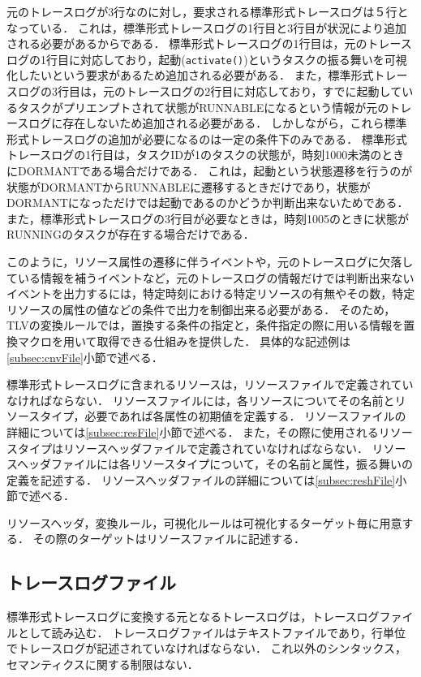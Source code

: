 元のトレースログが3行なのに対し，要求される標準形式トレースログは５行となっている．
これは，標準形式トレースログの1行目と3行目が状況により追加される必要があるからである．
標準形式トレースログの1行目は，元のトレースログの1行目に対応しており，起動(\verb|activate()|)というタスクの振る舞いを可視化したいという要求があるため追加される必要がある．
また，標準形式トレースログの3行目は，元のトレースログの2行目に対応しており，すでに起動しているタスクがプリエンプトされて状態がRUNNABLEになるという情報が元のトレースログに存在しないため追加される必要がある．
しかしながら，これら標準形式トレースログの追加が必要になるのは一定の条件下のみである．
標準形式トレースログの1行目は，タスクIDが1のタスクの状態が，時刻1000未満のときにDORMANTである場合だけである．
これは，起動という状態遷移を行うのが状態がDORMANTからRUNNABLEに遷移するときだけであり，状態がDORMANTになっただけでは起動であるのかどうか判断出来ないためである．
また，標準形式トレースログの3行目が必要なときは，時刻1005のときに状態がRUNNINGのタスクが存在する場合だけである．

このように，リソース属性の遷移に伴うイベントや，元のトレースログに欠落している情報を補うイベントなど，元のトレースログの情報だけでは判断出来ないイベントを出力するには，特定時刻における特定リソースの有無やその数，特定リソースの属性の値などの条件で出力を制御出来る必要がある．
そのため，TLVの変換ルールでは，置換する条件の指定と，条件指定の際に用いる情報を置換マクロを用いて取得できる仕組みを提供した．
具体的な記述例は\ref{subsec:cnvFile}小節で述べる．

標準形式トレースログに含まれるリソースは，リソースファイルで定義されていなければならない．
リソースファイルには，各リソースについてその名前とリソースタイプ，必要であれば各属性の初期値を定義する．
リソースファイルの詳細については\ref{subsec:resFile}小節で述べる．
また，その際に使用されるリソースタイプはリソースヘッダファイルで定義されていなければならない．
リソースヘッダファイルには各リソースタイプについて，その名前と属性，振る舞いの定義を記述する．
リソースヘッダファイルの詳細については\ref{subsec:reshFile}小節で述べる．

リソースヘッダ，変換ルール，可視化ルールは可視化するターゲット毎に用意する．
その際のターゲットはリソースファイルに記述する．

\subsection{トレースログファイル}

標準形式トレースログに変換する元となるトレースログは，トレースログファイルとして読み込む．
トレースログファイルはテキストファイルであり，行単位でトレースログが記述されていなければならない．
これ以外のシンタックス，セマンティクスに関する制限はない．

